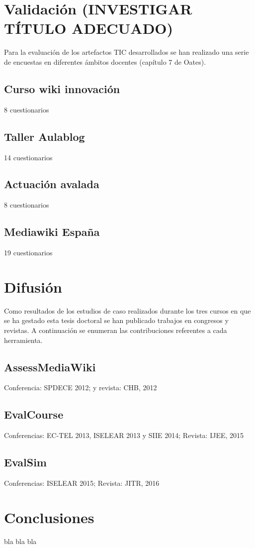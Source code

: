 \section{Validación (INVESTIGAR TÍTULO ADECUADO)}

	Para la evaluación de los artefactos TIC desarrollados se han realizado una serie de encuestas en diferentes ámbitos docentes (capítulo 7 de Oates).


	\subsection{Curso wiki innovación}

		8 cuestionarios

	\subsection{Taller Aulablog}

		14 cuestionarios

	\subsection{Actuación avalada}

		8 cuestionarios

	\subsection{Mediawiki España}

		19 cuestionarios

\section{Difusión}

	Como resultados de los estudios de caso realizados durante los tres cursos en que se ha gestado esta tesis doctoral se han publicado trabajos en congresos y revistas. A continuación se enumeran las contribuciones referentes a cada herramienta.

	\subsection{AssessMediaWiki}

		Conferencia: SPDECE 2012; y revista: CHB, 2012

	\subsection{EvalCourse}

		Conferencias: EC-TEL 2013, ISELEAR 2013 y SIIE 2014; Revista: IJEE, 2015

	\subsection{EvalSim}

		Conferencias: ISELEAR 2015; Revista: JITR, 2016

\section{Conclusiones}

	bla bla bla